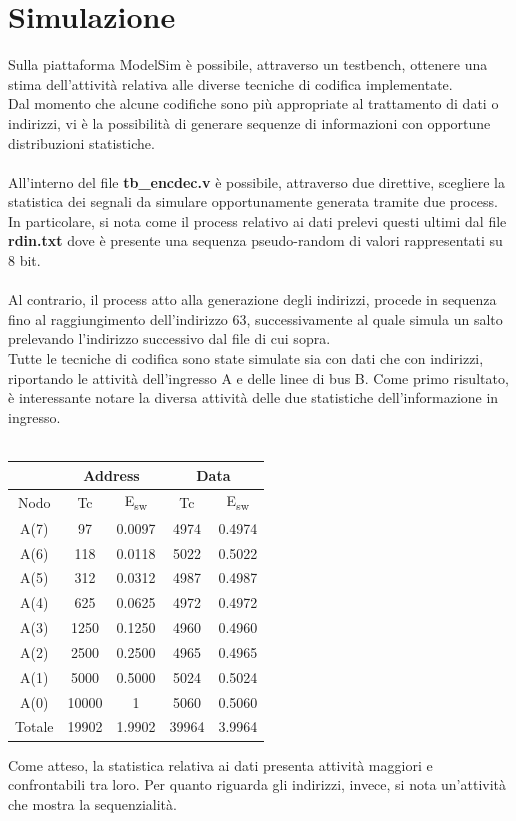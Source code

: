 \documentclass[11pt,  english, makeidx, a4paper, titlepage, oneside]{book}
\begin{document}
\section{Simulazione}
Sulla piattaforma ModelSim è possibile, attraverso un testbench, ottenere una stima dell'attività relativa alle diverse tecniche di codifica implementate.
\\
Dal momento che alcune codifiche sono più appropriate al trattamento di dati o indirizzi, vi è la possibilità di generare sequenze di informazioni con opportune distribuzioni statistiche.
\\\\
All'interno del file \textbf{tb\_encdec.v} è possibile, attraverso due direttive, scegliere la statistica dei segnali da simulare opportunamente generata tramite due process. In particolare, si nota come il process relativo ai dati prelevi questi ultimi dal file \textbf{rdin.txt} dove è presente una sequenza pseudo-random di valori rappresentati su 8 bit.
\\\\
Al contrario, il process atto alla generazione degli indirizzi, procede in sequenza fino al raggiungimento dell'indirizzo 63, successivamente al quale simula un salto prelevando l'indirizzo successivo dal file di cui sopra.
\\
Tutte le tecniche di codifica sono state simulate sia con dati che con indirizzi, riportando le attività dell'ingresso A e delle linee di bus B. Come primo risultato, è interessante notare la diversa attività delle due statistiche dell'informazione in ingresso.
\\\\
\begin{center}
	\begin{tabular}{|c|c|c||c|c|}
	\hline
	& \multicolumn{2}{c}{Address} & \multicolumn{2}{c}{Data}\\
	\hline
	Nodo & Tc & E\textsubscript{sw} & Tc & E\textsubscript{sw} \\
	\hline
	 A(7) & 97 & 0.0097 & 4974 & 0.4974\\
	 \hline
	A(6) & 118 & 0.0118 & 5022 & 0.5022\\
	\hline
	A(5) & 312 & 0.0312 & 4987 & 0.4987\\
	\hline
	A(4) & 625 & 0.0625 & 4972 & 0.4972\\
	\hline
	A(3) & 1250 & 0.1250 & 4960 & 0.4960\\
	\hline
	A(2) & 2500 & 0.2500 & 4965 & 0.4965\\
	\hline
	A(1) & 5000 & 0.5000 & 5024 & 0.5024\\
	\hline
	A(0) & 10000 & 1 & 5060 & 0.5060\\
	\hline
	Totale & 19902 & 1.9902 & 39964 & 3.9964\\
	\hline
	\end{tabular}	
\end{center}
\vspace{0.3cm}
Come atteso, la statistica relativa ai dati presenta attività maggiori e confrontabili tra loro. Per quanto riguarda gli indirizzi, invece, si nota un'attività che mostra la sequenzialità.
\end{document}
